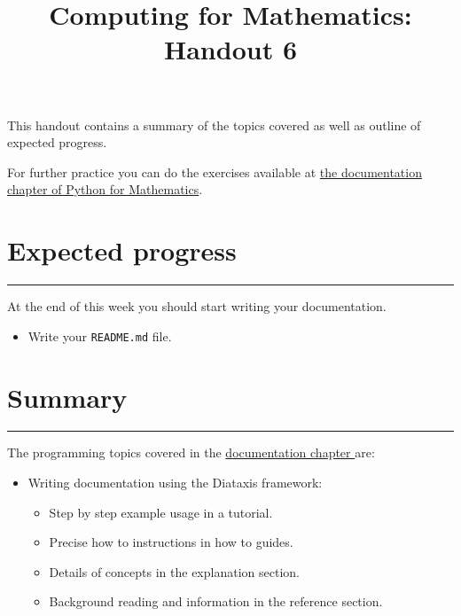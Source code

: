 \documentclass{article}
\title{Computing for Mathematics: Handout 6}
\date{}
\begin{document}
\maketitle


This handout contains a summary of the topics covered as well as outline of
expected progress.

For further practice you can do the exercises available at 
\href{https://vknight.org/pfm/building-tools/06-documentation/exercises/main.html}{the
documentation chapter of Python for Mathematics}.

\section{Expected progress}
\hrule

At the end of this week you should start writing your documentation.

\begin{itemize}
    \item Write your \texttt{README.md} file.
\end{itemize}

\begin{center}
\end{center}

\section{Summary}\label{summary}
\hrule

The programming topics covered in the
\href{https://vknight.org/pfm/building-tools/06-documentation/introduction/main.html}{documentation
chapter
} are:


\begin{itemize}
\item Writing documentation using the Diataxis framework:
    \begin{itemize}
      \item Step by step example usage in a tutorial.
      \item Precise how to instructions in how to guides.
      \item Details of concepts in the explanation section.
      \item Background reading and information in the reference section.
    \end{itemize}
\end{itemize}
\end{document}
